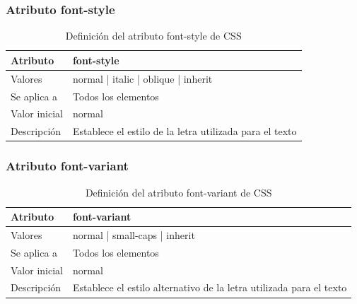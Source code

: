 \documentclass[ucs]{beamer}
\begin{document}
\begin{frame}
\frametitle{Atributo font-style}

\begin{center}
  \begin{table}
   \begin{tabular}{p{1.8cm}p{7.8cm}}
Atributo & \bf{font-style} \\ \hline
Valores& normal | italic | oblique | inherit \\ \hline
Se aplica a& Todos los elementos \\ \hline
Valor inicial& normal \\ \hline
Descripción& Establece el estilo de la letra utilizada para el texto \\ \hline
  \end{tabular}
   \caption{Definición del atributo font-style de CSS}
 \end{table}
\end{center}

\end{frame}



\begin{frame}
\frametitle{Atributo font-variant}

\begin{center}
  \begin{table}
   \begin{tabular}{p{1.8cm}p{7.8cm}}
Atributo & \bf{font-variant} \\ \hline
Valores& normal | small-caps | inherit \\ \hline
Se aplica a& Todos los elementos \\ \hline
Valor inicial& normal \\ \hline
Descripción& Establece el estilo alternativo de la letra utilizada para el texto \\ \hline
  \end{tabular}
   \caption{Definición del atributo font-variant de CSS}
 \end{table}
\end{center}


\end{frame}


\end{document}
